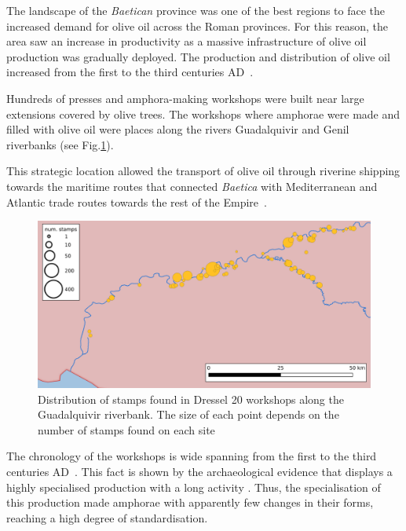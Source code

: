 \documentclass[review]{elsarticle}
\begin{document}
The landscape of the \textit{Baetican} province was one of the best regions to face the increased demand for olive oil across the Roman provinces. For this reason, the area saw an increase in productivity as a massive infrastructure of olive oil production was gradually deployed. The production and distribution of olive oil increased from the first to the third centuries AD~\citep{remesal_concierto}. 


Hundreds of presses and amphora-making workshops were built near large extensions covered by olive trees. The workshops where amphorae were made and filled with olive oil were places along the rivers Guadalquivir and Genil riverbanks (see Fig.\ref{workshop}).

This strategic location allowed the transport of olive oil through riverine shipping towards the maritime routes that connected \textit{Baetica} with Mediterranean and Atlantic trade routes towards the rest of the Empire~\citep{garcia_vargas_enrique_formal_2010}.

\begin{figure}[htp]
	\centering
\includegraphics[width=\linewidth]{figs/baetica}
\caption{Distribution of stamps found in Dressel 20 workshops along the Guadalquivir riverbank. The size of each point depends on the number of stamps found on each site}

\label{workshop}
\end{figure} 


The chronology of the workshops is wide spanning from the first to the third centuries AD~\citep{millet_anforas_1998,rodriguez_baetican_1998,chic2005comercio}. 
This fact is shown by the archaeological evidence that displays a highly specialised production with a long activity \citep{remesal_anforas_2004}. Thus, the specialisation of this production made amphorae with apparently few changes in their forms, reaching a high degree of standardisation. 
\end{document}
